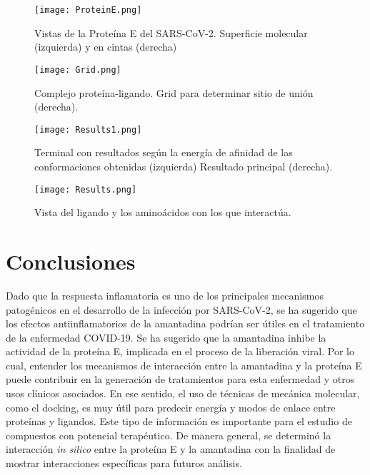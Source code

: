 \documentclass[12 pt]{article}
\begin{document}
    \begin{figure}[ht]
    \centering
    \texttt{[image: ProteinE.png]}
    \caption{Vistas de la Proteína E del SARS-CoV-2. Superficie molecular (izquierda) y en cintas (derecha)}
    \label{fig:ProteinE}
    \end{figure}
    
    \begin{figure}[ht]
    \centering
    \texttt{[image: Grid.png]}
    \caption{Complejo proteína-ligando. Grid para determinar sitio de unión (derecha).}
    \label{fig:Grid}
    \end{figure}
    
    \begin{figure}[ht]
    \centering
    \texttt{[image: Results1.png]}
    \caption{Terminal con resultados según la energía de afinidad de las conformaciones obtenidas (izquierda) Resultado principal (derecha).}
    \label{fig:Results1}
    \end{figure}
    
    \begin{figure}[ht]
    \centering
    \texttt{[image: Results.png]}
    \caption{Vista del ligando y los aminoácidos con los que interactúa.}
    \label{fig:Results}
    \end{figure}

\clearpage
\section{Conclusiones}
Dado que la respuesta inflamatoria es uno de los principales mecanismos patogénicos en el desarrollo de la infección por SARS-CoV-2, se ha sugerido que los efectos antiinflamatorios de la amantadina podrían ser útiles en el tratamiento de la enfermedad COVID-19. Se ha sugerido que la amantadina inhibe la actividad de la proteína E, implicada en el proceso de la liberación viral. Por lo cual, entender los mecanismos de interacción entre la amantadina y la proteína E puede contribuir en la generación de tratamientos para esta enfermedad y otros usos clínicos asociados. En ese sentido, el uso de técnicas de mecánica molecular, como el docking, es muy útil para predecir energía y modos de enlace entre proteínas y ligandos. Este tipo de información es importante para el estudio de compuestos con potencial terapéutico. De manera general, se determinó la interacción \textit{in silico} entre la proteína E y la amantadina con la finalidad de mostrar interacciones específicas para futuros análisis.  

\clearpage


\end{document}
